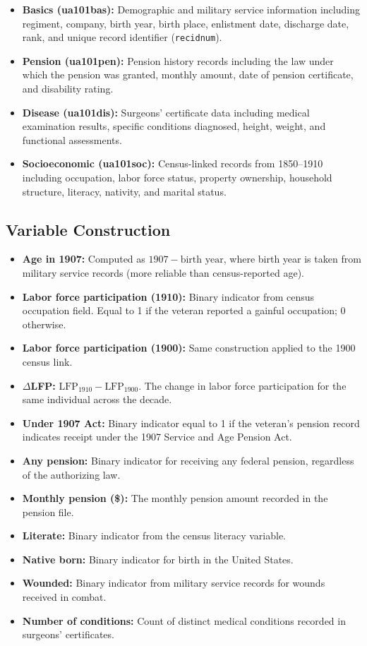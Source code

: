 \documentclass[12pt]{article}
\begin{document}
\begin{itemize}
\item \textbf{Basics (ua101bas):} Demographic and military service information including regiment, company, birth year, birth place, enlistment date, discharge date, rank, and unique record identifier (\texttt{recidnum}).
\item \textbf{Pension (ua101pen):} Pension history records including the law under which the pension was granted, monthly amount, date of pension certificate, and disability rating.
\item \textbf{Disease (ua101dis):} Surgeons' certificate data including medical examination results, specific conditions diagnosed, height, weight, and functional assessments.
\item \textbf{Socioeconomic (ua101soc):} Census-linked records from 1850--1910 including occupation, labor force status, property ownership, household structure, literacy, nativity, and marital status.
\end{itemize}

\subsection{Variable Construction}

\begin{itemize}
\item \textbf{Age in 1907:} Computed as $1907 - \text{birth year}$, where birth year is taken from military service records (more reliable than census-reported age).
\item \textbf{Labor force participation (1910):} Binary indicator from census occupation field. Equal to 1 if the veteran reported a gainful occupation; 0 otherwise.
\item \textbf{Labor force participation (1900):} Same construction applied to the 1900 census link.
\item \textbf{$\Delta$LFP:} $\text{LFP}_{1910} - \text{LFP}_{1900}$. The change in labor force participation for the same individual across the decade.
\item \textbf{Under 1907 Act:} Binary indicator equal to 1 if the veteran's pension record indicates receipt under the 1907 Service and Age Pension Act.
\item \textbf{Any pension:} Binary indicator for receiving any federal pension, regardless of the authorizing law.
\item \textbf{Monthly pension (\$):} The monthly pension amount recorded in the pension file.
\item \textbf{Literate:} Binary indicator from the census literacy variable.
\item \textbf{Native born:} Binary indicator for birth in the United States.
\item \textbf{Wounded:} Binary indicator from military service records for wounds received in combat.
\item \textbf{Number of conditions:} Count of distinct medical conditions recorded in surgeons' certificates.
\end{itemize}
\end{document}
